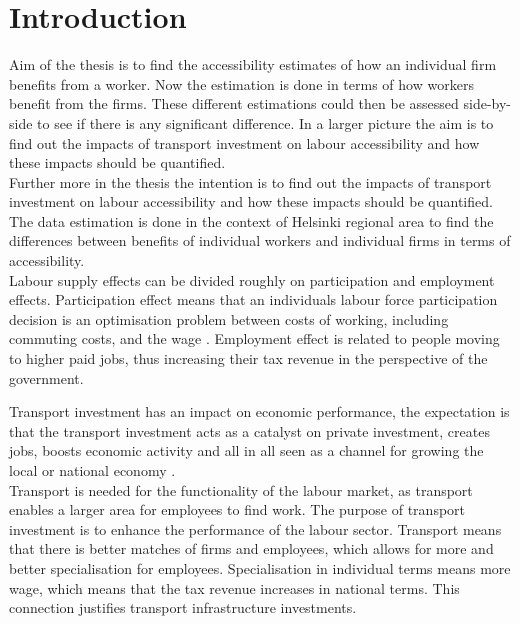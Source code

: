 \section{Introduction}

Aim of the thesis is to find the accessibility estimates of how an individual firm benefits from a worker. Now the estimation is done in terms of how workers benefit from the firms. These different estimations could then be assessed side-by-side to see if there is any significant difference. In a larger picture the aim is to find out the impacts of transport investment on labour accessibility and how these impacts should be quantified. \\

Further more in the thesis the intention is to find out the impacts of transport investment on labour accessibility and how these impacts should be quantified. The data estimation is done in the context of Helsinki regional area to find the differences between benefits of individual workers and individual firms in terms of accessibility.  \\

Labour supply effects can be divided roughly on participation and employment effects. Participation effect means that an individuals labour force participation decision is an optimisation problem between costs of working, including commuting costs, and the wage \citep{venables2017}. Employment effect is related to people moving to higher paid jobs, thus increasing their tax revenue in the perspective of the government.

Transport investment has an impact on economic performance, the expectation is that the transport investment acts as a catalyst on private investment, creates jobs, boosts economic activity and all in all seen as a channel for growing the local or national economy \citep{venables2017}. \\

Transport is needed for the functionality of the labour market, as transport  enables a larger area for employees to find work. The purpose of transport investment is to enhance the performance of the labour sector. Transport means that there is better matches of firms and employees, which allows for more and better specialisation for employees. Specialisation in individual terms means more wage, which means that the tax revenue increases in national terms. This connection justifies transport infrastructure investments. \\

